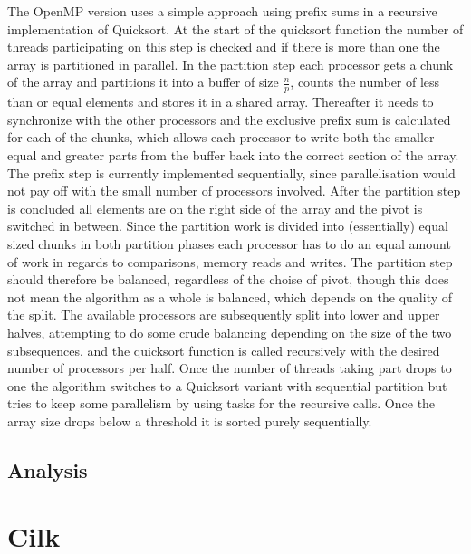 \documentclass[12pt,a4paper]{article}
\begin{document}
The OpenMP version uses a simple approach using prefix sums in a recursive implementation of Quicksort.
At the start of the quicksort function the number of threads participating on this step is checked and if there is more than one the array is partitioned in parallel.
In the partition step each processor gets a chunk of the array and partitions it into a buffer of size $\frac{n}{p}$, counts the number of less than or equal elements and stores it in a shared array. Thereafter it needs to synchronize with the other processors and the exclusive prefix sum is calculated for each of the chunks, which allows each processor to write both the smaller-equal and greater parts from the buffer back into the correct section of the array.
The prefix step is currently implemented sequentially, since parallelisation would not pay off with the small number of processors involved.
After the partition step is concluded all elements are on the right side of the array and the pivot is switched in between.  Since the partition work is divided into (essentially) equal sized chunks in both partition phases each processor has to do an equal amount of work in regards to comparisons, memory reads and writes. The partition step should therefore be balanced, regardless of the choise of pivot, though this does not mean the algorithm as a whole is balanced, which depends on the quality of the split.
The available processors are subsequently split into lower and upper halves, attempting to do some crude balancing depending on the size of the two subsequences, and the quicksort function is called recursively with the desired number of processors per half.
Once the number of threads taking part drops to one the algorithm switches to a Quicksort variant with sequential partition but tries to keep some parallelism by using tasks for the recursive calls. Once the array size drops below a threshold it is sorted purely sequentially.

\subsection{Analysis}
\section{Cilk}
\end{document}
